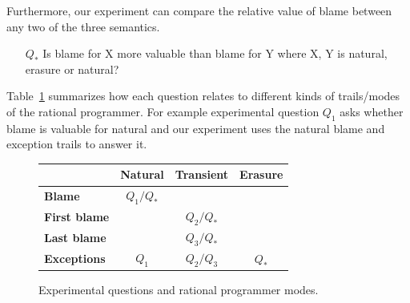 Furthermore, our experiment can compare the relative value of blame
between any two of the three semantics. 
\begin{itemize}
\item[$Q_*$] Is blame for X more valuable than blame for Y where X, Y is natural,
  erasure or natural?
\end{itemize}


Table~\ref{fig:experiment-outline} summarizes how each question relates to
different kinds of trails/modes of the rational programmer. For example experimental
question $Q_1$ asks whether blame is valuable for natural and our experiment
uses the natural blame and exception trails to answer it.

\begin{figure}[ht]
\center
{\begin{tabular}{l|c|c|c}
                        & {\bf Natural}  & {\bf Transient} &  {\bf Erasure} \\ \hline 
{\bf Blame}             &  $Q_1/Q_*$    &                  &                \\
{\bf First blame}       &               &     $Q_2/Q_*$    &                 \\
{\bf Last blame}        &               &     $Q_3/Q_*$    &                 \\
{\bf Exceptions}        &      $Q_1$    &     $Q_2/Q_3$    &      $Q_*$      \\
\end{tabular}}
  \caption{ Experimental questions and rational programmer modes.}
  \label{fig:experiment-outline}
\end{figure}


